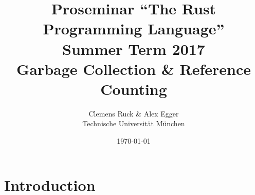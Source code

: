 \documentclass[twocolumn]{article}
\author{Clemens Ruck \& Alex Egger\\ Technische Universit\"at M\"unchen}
\title{Proseminar ``The Rust Programming Language'' \\
       Summer Term 2017 \\
       {\bf Garbage Collection \& Reference Counting}
}
\date{\today}
\begin{document}
\maketitle

\begin{abstract}
\end{abstract}

\section{Introduction}

\label{introduction}

\end{document}

